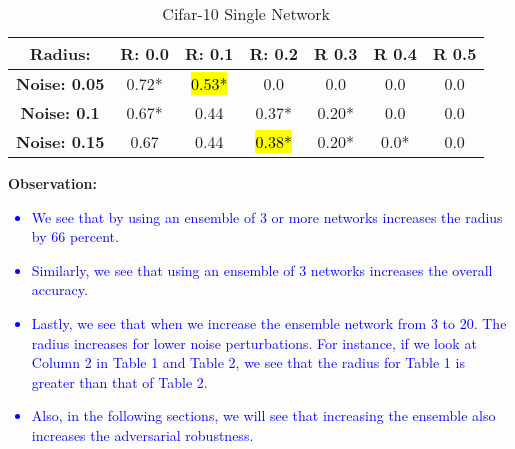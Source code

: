\documentclass{article}
\begin{document}
\begin{table}[htb]
    \centering
    \begin{tabular}{|c|c|c|c|c|c|c|} \hline 
        
        \textbf{Radius: } & \textbf{R: 0.0} & \textbf{R: 0.1} & \textbf{R: 0.2} & \textbf{R 0.3} & \textbf{R 0.4} & \textbf{R 0.5} \\ \hline 
        
        \textbf{Noise: 0.05} & 0.72* & \hl{0.53*} & 0.0 & 0.0 & 0.0 & 0.0 \\ \hline 
        
        \textbf{Noise: 0.1} & 0.67* & 0.44 & 0.37* & 0.20* & 0.0 & 0.0 \\ \hline

        \textbf{Noise: 0.15} & 0.67 & 0.44 & \hl{0.38*} & 0.20* & 0.0* & 0.0 \\ \hline
        
    \end{tabular}
    \caption{Cifar-10 Single Network}
    \label{tab:example}
\end{table}
\newpage
\textbf{Observation:}
\textcolor{blue}{
\begin{itemize}
    \item We see that by using an ensemble of 3 or more networks increases the radius by 66 percent.
    \item Similarly, we see that using an ensemble of 3 networks increases the overall accuracy. 
    \item Lastly, we see that when we increase the ensemble network from 3 to 20. The radius increases for lower noise perturbations. For instance, if we look at Column 2 in Table 1 and Table 2, we see that the radius for Table 1 is greater than that of Table 2.
    \item Also, in the following sections, we will see that increasing the ensemble also increases the adversarial robustness.    
\end{itemize}
}
\end{document}
